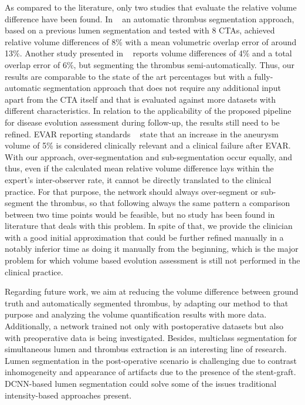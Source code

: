\documentclass[preprint,authoryear,12pt]{elsarticle}
\begin{document}
As compared to the literature, only two studies that evaluate the relative volume difference have been found. In ~\citep{Mot10} an automatic thrombus segmentation approach, based on a previous lumen segmentation and tested with 8 CTAs, achieved relative volume differences of 8\% with a mean volumetric overlap error of around 13\%. Another study presented in ~\citep{Zoh12} reports volume differences of 4\% and a total overlap error of 6\%, but segmenting the thrombus semi-automatically. Thus, our results are comparable to the state of the art percentages but with a fully-automatic segmentation approach that does not require any additional input apart from the CTA itself and that is evaluated against more datasets with different characteristics. In relation to the applicability of the proposed pipeline for disease evolution assessment during follow-up, the results still need to be refined. EVAR reporting standards ~\citep{Cha02} state that an increase in the aneurysm volume of 5\% is considered clinically relevant and a clinical failure after EVAR. With our approach, over-segmentation and sub-segmentation occur equally, and thus, even if the calculated mean relative volume difference lays within the expert's inter-observer rate, it cannot be directly translated to the clinical practice. For that purpose, the network should always over-segment or sub-segment the thrombus, so that following always the same pattern a comparison between two time points would be feasible, but no study has been found in literature that deals with this problem. In spite of that, we provide the clinician with a good initial approximation that could be further refined manually in a notably inferior time as doing it manually from the beginning, which is the major problem for which volume based evolution assessment is still not performed in the clinical practice. 



Regarding future work, we aim at reducing the volume difference between ground truth and automatically segmented thrombus, by adapting our method to that purpose and analyzing the volume quantification results with more data. Additionally, a network trained not only with postoperative datasets but also with preoperative data is being investigated. Besides, multiclass segmentation for simultaneous lumen and thrombus extraction is an interesting line of research. Lumen segmentation in the post-operative scenario is challenging due to contrast inhomogeneity and appearance of artifacts due to the presence of the stent-graft. DCNN-based lumen segmentation could solve some of the issues traditional intensity-based approaches present.  
\end{document}

